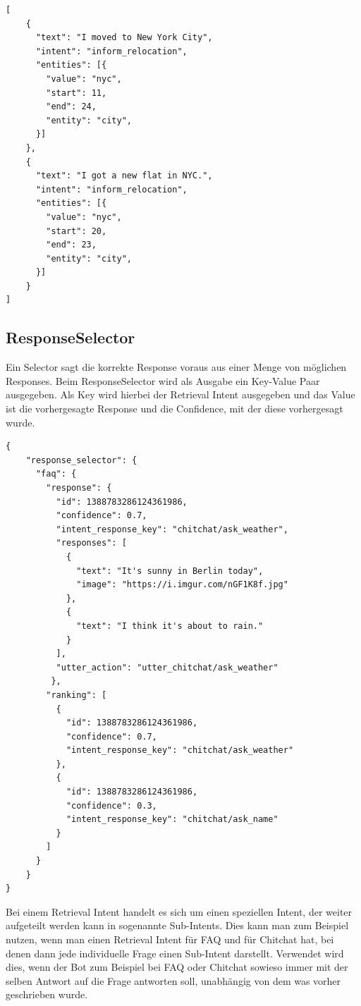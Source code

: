 \begin{lstlisting}[label={lst: EntitySynonymMapper}]
[
    {
      "text": "I moved to New York City",
      "intent": "inform_relocation",
      "entities": [{
        "value": "nyc",
        "start": 11,
        "end": 24,
        "entity": "city",
      }]
    },
    {
      "text": "I got a new flat in NYC.",
      "intent": "inform_relocation",
      "entities": [{
        "value": "nyc",
        "start": 20,
        "end": 23,
        "entity": "city",
      }]
    }
]
\end{lstlisting}

\subsection{ResponseSelector}

Ein Selector sagt die korrekte Response voraus aus einer Menge von möglichen Responses.
Beim ResponseSelector wird als Ausgabe ein Key-Value Paar ausgegeben.
Als Key wird hierbei der Retrieval Intent ausgegeben und das Value ist die vorhergesagte Response und die Confidence, mit der diese vorhergesagt wurde.\cite{responseSelector}

\begin{lstlisting}[label={lst: ResponseSelector}]
{
    "response_selector": {
      "faq": {
        "response": {
          "id": 1388783286124361986,
          "confidence": 0.7,
          "intent_response_key": "chitchat/ask_weather",
          "responses": [
            {
              "text": "It's sunny in Berlin today",
              "image": "https://i.imgur.com/nGF1K8f.jpg"
            },
            {
              "text": "I think it's about to rain."
            }
          ],
          "utter_action": "utter_chitchat/ask_weather"
         },
        "ranking": [
          {
            "id": 1388783286124361986,
            "confidence": 0.7,
            "intent_response_key": "chitchat/ask_weather"
          },
          {
            "id": 1388783286124361986,
            "confidence": 0.3,
            "intent_response_key": "chitchat/ask_name"
          }
        ]
      }
    }
}
\end{lstlisting}

Bei einem Retrieval Intent handelt es sich um einen speziellen Intent, der weiter aufgeteilt werden kann in sogenannte Sub-Intents.
Dies kann man zum Beispiel nutzen, wenn man einen Retrieval Intent für FAQ und für Chitchat hat, bei denen dann jede individuelle Frage einen Sub-Intent darstellt.\cite{retrievalIntent}
Verwendet wird dies, wenn der Bot zum Beispiel bei FAQ oder Chitchat sowieso immer mit der selben Antwort auf die Frage antworten soll, unabhängig von dem was vorher geschrieben wurde.\cite{chitchatAndFaqs}

